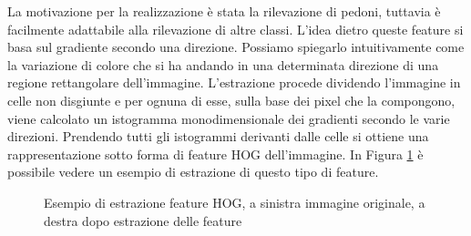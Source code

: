 La motivazione per la realizzazione è stata la rilevazione di pedoni, tuttavia è facilmente adattabile alla rilevazione di altre classi. 
L'idea dietro queste feature si basa sul gradiente secondo una direzione. Possiamo spiegarlo intuitivamente come la variazione di colore che si ha andando in una determinata direzione di una regione rettangolare dell'immagine. 
L'estrazione procede dividendo l'immagine in celle non disgiunte e per ognuna di esse, sulla base dei pixel che la compongono, viene calcolato un istogramma monodimensionale dei gradienti secondo le varie direzioni. Prendendo tutti gli istogrammi derivanti dalle celle si ottiene una rappresentazione sotto forma di feature \ac{HOG} dell'immagine. In Figura \ref{fig:hog} è possibile vedere un esempio di estrazione di questo tipo di feature.
\begin{figure}[]
    \centering
    \caption{Esempio di estrazione feature HOG, a sinistra immagine originale, a destra dopo estrazione delle feature} 
    \label{fig:hog} 
\end{figure}

